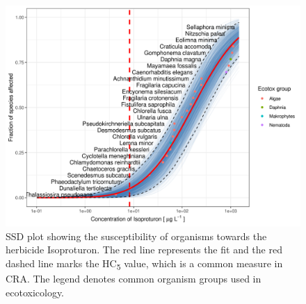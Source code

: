 \begin{figure}[h!]
    \includegraphics[width=1\linewidth]{article/figures/ssd2_boot.png}
    \caption{SSD plot showing the susceptibility of organisms towards the herbicide Isoproturon. The red line represents the fit and the red dashed line marks the HC\textsubscript{5} value, which is a common measure in CRA. The legend denotes common organism groups used in ecotoxicology.}
    \label{fig:ssd-isoproturon}
\end{figure}


